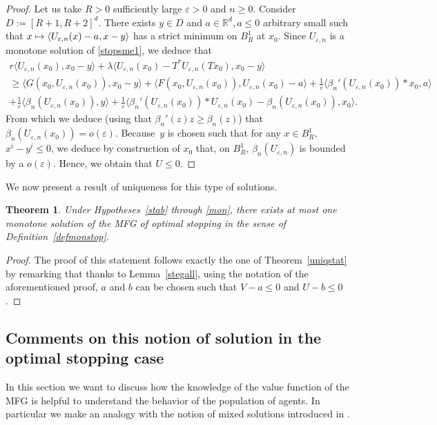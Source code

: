 \documentclass[10pt]{amsart}
\newcommand\mto{\mathchoice{\longmapsto}{\mapsto}{\mapsto}{\mapsto}}
\let\epsilon\varepsilon
\newtheorem{Theorem}{Theorem}[section]
\theoremstyle{definition}
\begin{document}
\begin{proof}
Let us take $R > 0$ sufficiently large $\epsilon > 0$ and $n \geq 0$. Consider $D:= [R+1,R+2]^d$. There exists $y \in D$ and $a \in \mathbb{R}^d, a \leq 0$ arbitrary small such that $x \mto \langle U_{\epsilon,n}(x) -a, x -y\rangle$ has a strict minimum on $B^1_R$ at $x_0$. Since $U_{\epsilon,n}$ is a monotone solution of \eqref{stopsme1}, we deduce that
\begin{multline*}
r\langle U_{\epsilon,n}(x_0),x_0-y\rangle+\lambda \langle U_{\epsilon,n}(x_0)-T^*U_{\epsilon,n}(Tx_0),x_0 -y\rangle \\
\geq
\langle G(x_0,U_{\epsilon,n}(x_0)),x_0-y\rangle+\langle F(x_0,U_{\epsilon,n}(x_0)), U_{\epsilon,n}(x_0) -a\rangle +\frac{1}{\epsilon} \langle \beta_n'(U_{\epsilon,n}(x_0))*x_0, a\rangle\\
+\frac{1}{\epsilon} \langle \beta_n(U_{\epsilon,n}(x_0)), y\rangle+\frac{1}{\epsilon}\langle \beta_n'(U_{\epsilon,n}(x_0))*U_{\epsilon,n}(x_0)-\beta_n(U_{\epsilon,n}(x_0)),x_0\rangle.
\end{multline*}
From which we deduce (using that $\beta_n'(z)z \geq \beta_n(z)$) that $\beta_n(U_{\epsilon,n}(x_0)) = o(\epsilon)$. Because~$y$ is chosen such that for any $x \in B^1_R$, $x^i-y^i \leq 0$, we deduce by construction of $x_0$ that, on $B^1_R$, $\beta_n(U_{\epsilon,n})$ is bounded by a $o(\epsilon)$. Hence, we obtain that $U \leq 0$.
\end{proof}
We now present a result of uniqueness for this type of solutions.

\begin{Theorem}
Under Hypotheses~\ref{stab} through \ref{mon}, there exists at most one monotone solution of the MFG of optimal stopping in the sense of Definition~\ref{defmonstop}.
\end{Theorem}

\begin{proof}
The proof of this statement follows exactly the one of Theorem~\ref{uniqstat} by remarking that thanks to Lemma~\ref{stegall}, using the notation of the aforementioned proof, $a$ and $b$ can be chosen such that $V-a \leq 0$ and $U-b \leq 0$.
\end{proof}

\subsection{Comments on this notion of solution in the optimal stopping case}
In this section we want to discuss how the knowledge of the value function of the MFG is helpful to understand the behavior of the population of agents. In particular we make an analogy with the notion of mixed solutions introduced in \cite{bertucci2018optimal}.
\end{document}
